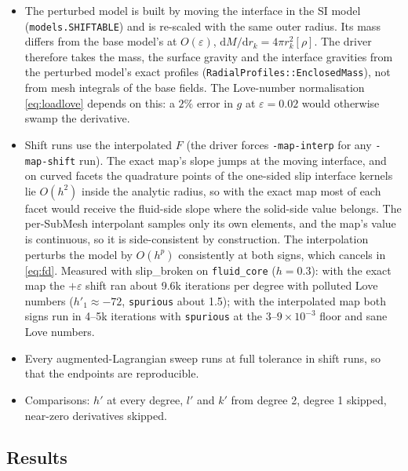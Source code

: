 \documentclass[11pt]{article}
\numberwithin{equation}{section}
\newcommand{\eps}{\varepsilon}
\newcommand{\code}[1]{\texttt{#1}}
\begin{document}
\begin{itemize}[leftmargin=*]
\item The perturbed model is built by moving the interface in the SI
  model (\code{models.SHIFTABLE}) and is re-scaled with the same outer
  radius. Its mass differs from the base model's at $O(\eps)$,
  $\mathrm{d}M/\mathrm{d}r_k = 4\pi r_k^2[\rho]$. The driver therefore
  takes the mass, the surface gravity and the interface gravities from
  the perturbed model's exact profiles (\code{RadialProfiles::EnclosedMass}),
  not from mesh integrals of the base fields. The Love-number
  normalisation \eqref{eq:loadlove} depends on this: a $2\%$ error in $g$
  at $\eps=0.02$ would otherwise swamp the derivative.
\item Shift runs use the interpolated $F$ (the driver forces
  \code{-map-interp} for any \code{-map-shift} run). The exact map's slope
  jumps at the moving interface, and on curved facets the quadrature points
  of the one-sided slip interface kernels lie $O(h^2)$ inside the analytic
  radius, so with the exact map most of each facet would receive the
  fluid-side slope where the solid-side value belongs. The per-SubMesh
  interpolant samples only its own elements, and the map's value is
  continuous, so it is side-consistent by construction. The interpolation
  perturbs the model by $O(h^p)$ consistently at both signs, which cancels
  in \eqref{eq:fd}. Measured with slip\_broken on \code{fluid\_core}
  ($h=0.3$): with the exact map the $+\eps$ shift ran about 9.6k iterations
  per degree with polluted Love numbers ($h'_1\approx-72$, \code{spurious}
  about 1.5); with the interpolated map both signs run in 4--5k iterations
  with \code{spurious} at the $3$--$9\times10^{-3}$ floor and sane Love
  numbers.
\item Every augmented-Lagrangian sweep runs at full tolerance in shift
  runs, so that the endpoints are reproducible.
\item Comparisons: $h'$ at every degree, $l'$ and $k'$ from degree 2,
  degree 1 skipped, near-zero derivatives skipped.
\end{itemize}

\subsection{Results}
\end{document}
